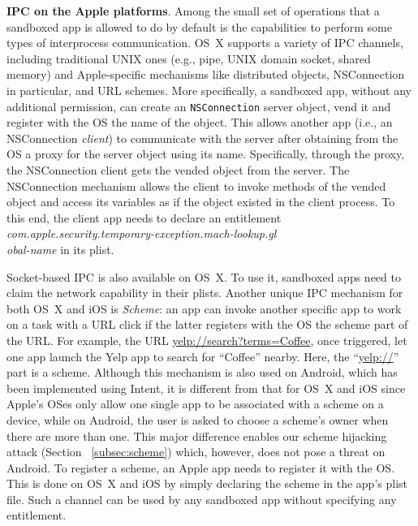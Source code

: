 \documentclass{article}
\newcommand{\ignore}[1]{}
\begin{document}
\vspace {3pt}\noindent\textbf{IPC on the Apple platforms}. Among the small set of operations that a sandboxed app is allowed to do by default is the capabilities to perform some types of interprocess communication. OS~X supports a variety of IPC channels, including traditional UNIX ones (e.g., pipe, UNIX domain socket, shared memory) and Apple-specific mechanisms like distributed objects, NSConnection in particular, and URL schemes.  More specifically, a sandboxed app, without any additional permission, can create an \texttt{NSConnection} server object, vend it and register with the OS the name of the object. This allows another app (i.e., an NSConnection \textit{client}) to communicate with the server after obtaining from the OS a proxy for the server object using its name. Specifically, through the proxy, the NSConnection client gets the vended object from the server. The NSConnection mechanism allows the client to invoke methods of the vended object and access its variables as if the object existed in the client process.  To this end, the client app needs to declare an entitlement \textit{com.apple.security.temporary-exception.mach-lookup.gl\\obal-name} in its plist.




Socket-based IPC is also available on OS~X. To use it, sandboxed apps need to claim the network capability in their plists. Another unique IPC mechanism for both OS~X and iOS is \textit{Scheme}: an app can invoke another specific app to work on a task with a URL click if the latter registers with the OS the scheme part of the URL. For example, the URL \url{yelp://search?terms=Coffee}, once triggered, let one app launch the Yelp app to search for ``Coffee'' nearby. Here, the ``\url{yelp://}'' part is a scheme. Although this mechanism is also used on Android, which has been implemented using Intent, it is different from that for OS~X and iOS since Apple's OSes only allow one single app to be associated with a scheme on a device, while on Android, the user is asked to choose a scheme's owner when there are more than one.  This major difference enables our scheme hijacking attack (Section ~\ref{subsec:scheme}) which, however, does not pose a threat on Android. \ignore{it is the major IPC for iOS apps.} To register a scheme, an Apple app needs to register it with the OS.  This is done on OS~X and iOS by simply declaring the scheme in the app's plist file. Such a channel can be used by any sandboxed app without specifying any entitlement.
\end{document}
